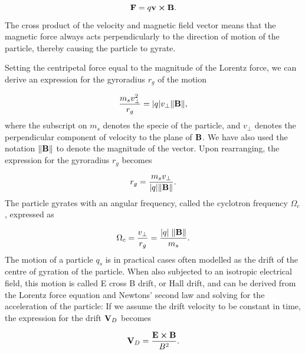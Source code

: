 \begin{equation}\label{eq:magF}
    \vb{F} = q \vb{v} \cp \vb{B}.
\end{equation}
The cross product of the velocity and magnetic field vector means that the magnetic force always acts perpendicularly to the direction of motion of the particle, thereby causing the particle to gyrate.

Setting the centripetal force equal to the magnitude of the Lorentz force, we can derive an expression for the gyroradius $r_g$ of the motion

\begin{equation}\label{eq:gyrorad}
    \frac{m_s v_{\perp}^2}{r_g} = \abs{q} v_{\perp} \norm{\vb{B}},
\end{equation}
where the subscript on $m_s$ denotes the specie of the particle, and $v_\perp$ denotes the perpendicular component of velocity to the plane of $\vb{B}$. We have also used the notation $\norm{\vb{B}}$ to denote the magnitude of the vector. Upon rearranging, the expression for the gyroradius $r_g$ becomes

\begin{equation}
    r_g = \frac{m_s v_\perp}{\abs{q} \norm{\vb{B}}}.
\end{equation}
The particle gyrates with an angular frequency, called the cyclotron frequency $\Omega_c$, expressed as 

\begin{equation}
    \Omega_c = \frac{v_\perp}{r_g} = \frac{\abs{q} \; \norm{\vb{B}}}{m_s}.
\end{equation}
The motion of a particle $q_s$ is in practical cases often modelled as the drift of the centre of gyration of the particle. When also subjected to an isotropic electrical field, this motion is called E cross B drift, or Hall drift, and can be derived from the Lorentz force equation and Newtons' second law and solving for the acceleration of the particle: If we assume the drift velocity to be constant in time, the expression for the drift $\vb{V}_D$ becomes

\begin{equation}
    \vb{V}_D = \frac{\vb{E} \cp \vb{B}}{B^2}.
\end{equation}

